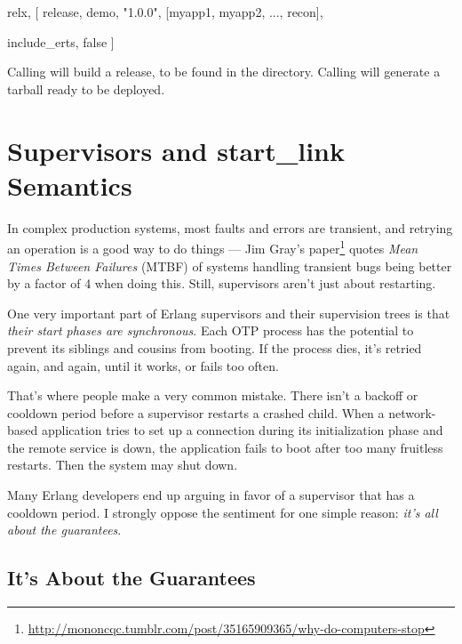 \begin{VerbatimText}
{relx, [
  {release, {demo, "1.0.0"},
    [myapp1, myapp2, ..., recon]},
     
  {include_erts, false} %
]}
\end{VerbatimText}

Calling  will build a release, to be found in the  directory. Calling  will generate a tarball ready to be deployed.

\section{Supervisors and start\_link Semantics}
\label{sec:supervisors-and-start-link-semantics}

In complex production systems, most faults and errors are transient, and retrying an operation is a good way to do things — Jim Gray's paper\footnote{\href{http://mononcqc.tumblr.com/post/35165909365/why-do-computers-stop}{http://mononcqc.tumblr.com/post/35165909365/why-do-computers-stop}} quotes \emph{Mean Times Between Failures} (MTBF) of systems handling transient bugs being better by a factor of 4 when doing this. Still, supervisors aren't just about restarting.

One very important part of Erlang supervisors and their supervision trees is that \emph{their start phases are synchronous}. Each OTP process has the potential to prevent its siblings and cousins from booting. If the process dies, it's retried again, and again, until it works, or fails too often.

That's where people make a very common mistake. There isn't a backoff or cooldown period before a supervisor restarts a crashed child. When a network-based application tries to set up a connection during its initialization phase and the remote service is down, the application fails to boot after too many fruitless restarts. Then the system may shut down.

Many Erlang developers end up arguing in favor of a supervisor that has a cooldown period. I strongly oppose the sentiment for one simple reason: \emph{it's all about the guarantees}.

\subsection{It's About the Guarantees}
\label{subsec:start-link-guarantees}

